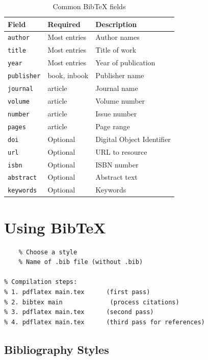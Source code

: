 \begin{table}[H]
\centering
\begin{tabular}{lll}
\toprule
\textbf{Field} & \textbf{Required} & \textbf{Description} \\
\midrule
\texttt{author}    & Most entries & Author names \\
\texttt{title}     & Most entries & Title of work \\
\texttt{year}      & Most entries & Year of publication \\
\texttt{publisher} & book, inbook & Publisher name \\
\texttt{journal}   & article      & Journal name \\
\texttt{volume}    & article      & Volume number \\
\texttt{number}    & article      & Issue number \\
\texttt{pages}     & article      & Page range \\
\texttt{doi}       & Optional     & Digital Object Identifier \\
\texttt{url}       & Optional     & URL to resource \\
\texttt{isbn}      & Optional     & ISBN number \\
\texttt{abstract}  & Optional     & Abstract text \\
\texttt{keywords}  & Optional     & Keywords \\
\bottomrule
\end{tabular}
\caption{Common BibTeX fields}
\end{table}

\section{Using BibTeX}

\begin{lstlisting}[language={[LaTeX]TeX}, caption=Using BibTeX]
% In your .tex file, at the end:
    % Choose a style
    % Name of .bib file (without .bib)

% Compilation steps:
% 1. pdflatex main.tex      (first pass)
% 2. bibtex main             (process citations)
% 3. pdflatex main.tex      (second pass)
% 4. pdflatex main.tex      (third pass for references)
\end{lstlisting}

\subsection{Bibliography Styles}


